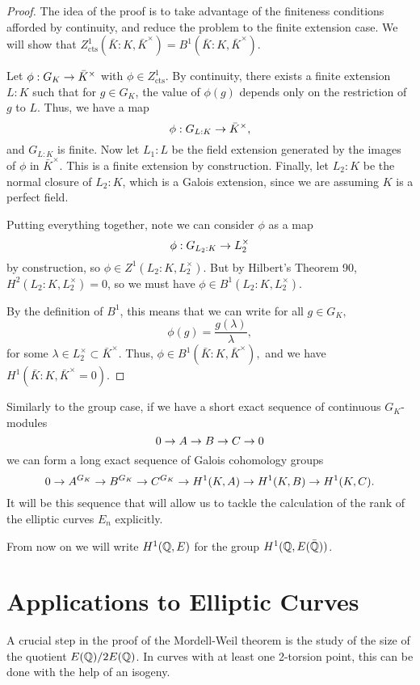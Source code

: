 \documentclass[12pt, a4paper]{report}
\begin{document}
\begin{proof}
  The idea of the proof is to take advantage of the finiteness conditions
  afforded by continuity, and reduce the problem to the finite extension case.
  We will show that $Z^1_\text{cts} (\bar{K}:K, \bar{K}^\times) = B^1(\bar{K}:K,
  \bar{K}^\times).$

  Let $\phi : G_K \rightarrow \bar{K}^\times $ with $\phi \in Z^1_{\text{cts}}.$ By
  continuity, there exists a finite extension $L:K$ such that for $g \in G_K$,
  the value of $\phi(g)$ depends only on the restriction of $g$ to $L$. Thus, we
  have a map 
  \[\phi: G_{L:K} \rightarrow \bar{K}^\times, \]
  and $G_{L:K}$ is finite. Now let $L_1:L$ be the field extension generated
  by the images of $\phi$ in $\bar{K}^\times$. This is a finite extension by
  construction. Finally, let $L_2:K$ be the normal closure of $L_2:K$, which is a
  Galois extension, since we are assuming $K$ is a perfect field.

  Putting everything together, note we can consider $\phi$ as a map
  \[\phi: G_{L_2:K} \rightarrow L_2^\times\]
  by construction, so $\phi \in Z^1(L_2 : K, L_2^\times)$. But by Hilbert's
  Theorem 90, $H^2(L_2:K, L_2^\times) = 0$, so we must have $\phi \in B^1(L_2:K,
  L_2^\times).$
  
  By the definition of $B^1$, this means that we can write for all $g \in G_K,$ 
  \[\phi(g) = \frac{g(\lambda)}{\lambda},\]
  for some $\lambda \in L_2^\times \subset \bar{K}^\times.$
  Thus, $\phi \in B^1(\bar{K}:K, \bar{K}^\times),$ and we have $H^1(\bar{K}:K,
  \bar{K}^\times = 0).$


  
\end{proof}
  
Similarly to the group case, if we have a short exact sequence of continuous $G_K$-modules
\[ 0 \rightarrow A \rightarrow B \rightarrow C \rightarrow 0\]
we can form a long exact sequence of Galois cohomology groups
\[0 \rightarrow A^{G_K} \rightarrow B^{G_K} \rightarrow C^{G_K} \rightarrow H^1(K,A) \rightarrow H^1(K,B) \rightarrow H^1(K,C).\]
It will be this sequence that will allow us to tackle the calculation of the
rank of the elliptic curves $E_n$ explicitly.

\begin{remark}
  From now on we will write $H^1({\mathbb Q}, E)$ for the group $H^1({\mathbb Q}, E(\bar{{\mathbb Q}}))$.
\end{remark}

\section{Applications to Elliptic Curves} \label{sec:applications}
A crucial step in the proof of the Mordell-Weil theorem is the study of the size
of the quotient $E({\mathbb Q}) / 2 E({\mathbb Q})$. In curves with at least one 2-torsion
point, this can be done with the help of an isogeny.
\end{document}
